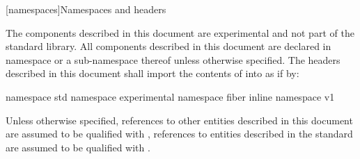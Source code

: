 
[namespaces]{Namespaces and headers}

\pnum
The components described in this document are experimental and not part of the
\Cpp standard library. All components described in this document are declared in
namespace  or a sub-namespace thereof unless
otherwise specified. The headers described in this document shall import the
contents of  into
 as if by:

\begin{codeblock}
namespace std {
  namespace experimental {
      namespace fiber {
      inline namespace v1 {}
    }
  }
}
\end{codeblock}

\pnum
Unless otherwise specified, references to other entities described in this
document are assumed to be qualified with ,
references to entities described in the \Cpp standard are assumed to be
qualified with .


